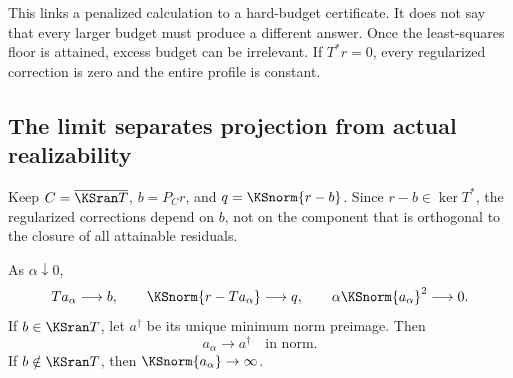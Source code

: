 This links a penalized calculation to a hard-budget certificate. It does not say that every larger budget must produce a different answer. Once the least-squares floor is attained, excess budget can be irrelevant. If $T^*r=0$, every regularized correction is zero and the entire profile is constant.

\subsection{The limit separates projection from actual realizability}
Keep $C=\overline{\KSran T}$, $b=P_Cr$, and $q=\KSnorm{r-b}$. Since $r-b\in\ker T^*$, the regularized corrections depend on $b$, not on the component that is orthogonal to the closure of all attainable residuals.

\begin{KStheorem}\label{KS:WR08}
As $\alpha\downarrow0$,
\[
 Ta_\alpha\longrightarrow b,\qquad
 \KSnorm{r-Ta_\alpha}\longrightarrow q,\qquad
 \alpha\KSnorm{a_\alpha}^2\longrightarrow0.
\]
If $b\in\KSran T$, let $a^\dagger$ be its unique minimum norm preimage. Then
\[
 a_\alpha\longrightarrow a^\dagger\quad\text{in norm}.
\]
If $b\notin\KSran T$, then $\KSnorm{a_\alpha}\to\infty$.
\end{KStheorem}

